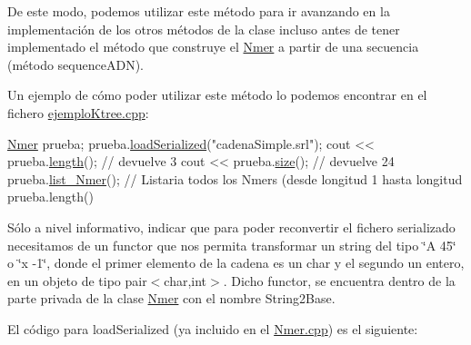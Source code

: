 De este modo, podemos utilizar este método para ir avanzando en la implementación de los otros métodos de la clase incluso antes de tener implementado el método que construye el \hyperlink{classNmer}{Nmer} a partir de una secuencia (método sequence\+A\+DN).

Un ejemplo de cómo poder utilizar este método lo podemos encontrar en el fichero \hyperlink{ejemploKtree_8cpp}{ejemplo\+Ktree.\+cpp}\+:


\begin{DoxyCode}
\hyperlink{classNmer}{Nmer} prueba;
prueba.\hyperlink{classNmer_a418c016bb6e04d2f699ddb694ee0221f}{loadSerialized}(\textcolor{stringliteral}{"cadenaSimple.srl"});
cout << prueba.\hyperlink{classNmer_a60e2335600c01ee39e865790015818f0}{length}(); \textcolor{comment}{// devuelve 3}
cout << prueba.\hyperlink{classNmer_accdea65838fcd53c48a2d05f6809643f}{size}(); \textcolor{comment}{// devuelve 24}
prueba.\hyperlink{classNmer_a1ce1c0cb174d94685c7234f58f9dc119}{list\_Nmer}();  \textcolor{comment}{// Listaria todos los Nmers (desde longitud 1 hasta longitud prueba.length()}
\end{DoxyCode}


Sólo a nivel informativo, indicar que para poder reconvertir el fichero serializado necesitamos de un functor que nos permita transformar un string del tipo \char`\"{}\+A 45\char`\"{} o \char`\"{}x -\/1\char`\"{}, donde el primer elemento de la cadena es un char y el segundo un entero, en un objeto de tipo pair$<$char,int$>$. Dicho functor, se encuentra dentro de la parte privada de la clase \hyperlink{classNmer}{Nmer} con el nombre String2\+Base.

El código para load\+Serialized (ya incluido en el {\ttfamily \hyperlink{Nmer_8cpp}{Nmer.\+cpp}}) es el siguiente\+:


